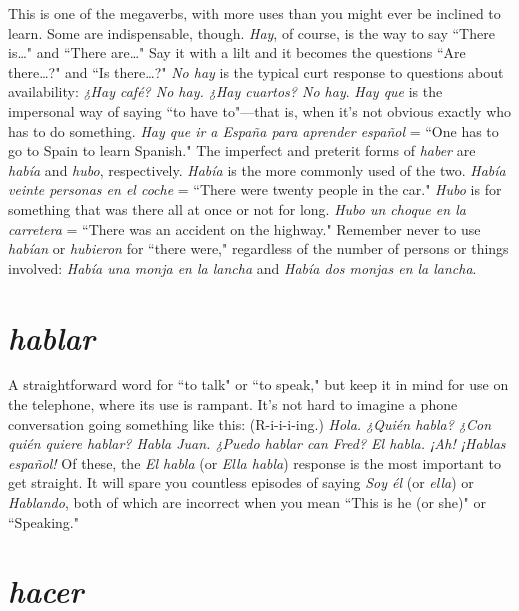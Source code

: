 This is one of the megaverbs, with more uses than you might
ever be inclined to learn. Some are indispensable, though. \emph{Hay}, of
course, is the way to say ``There is\ldots{}" and ``There are\ldots{}" Say it
with a lilt and it becomes the questions ``Are there\ldots{}?" and ``Is
there\ldots{}?" \emph{No hay} is the typical curt response to questions about
availability: \emph{¿Hay café? No hay. ¿Hay cuartos? No hay}. \emph{Hay que} is the
impersonal way of saying ``to have to"---that is, when it's not obvious
exactly who has to do something. \emph{Hay que ir a España para aprender
español} = ``One has to go to Spain to learn Spanish." The imperfect
and preterit forms of \emph{haber} are \emph{había} and \emph{hubo}, respectively. \emph{Había}
is the more commonly used of the two. \emph{Había veinte personas en el
coche} = ``There were twenty people in the car." \emph{Hubo} is for something that was there all at once or not for long. \emph{Hubo un choque en la
carretera} = ``There was an accident on the highway." Remember never
to use \emph{habían} or \emph{hubieron} for ``there were," regardless of the number
of persons or things involved: \emph{Había una monja en la lancha} and \emph{Había dos monjas en la lancha}.

\section{\emph{hablar}}

A straightforward word for ``to talk" or ``to speak," but keep
it in mind for use on the telephone, where its use is rampant. It's not
hard to imagine a phone conversation going something like this:
(R-i-i-i-ing.) \emph{Hola. ¿Quién habla? ¿Con quién quiere hablar? Habla
Juan. ¿Puedo hablar can Fred? El habla. ¡Ah! ¡Hablas español!} Of
these, the \emph{El habla} (or \emph{Ella habla}) response is the most important to
get straight. It will spare you countless episodes of saying \emph{Soy él} (or
\emph{ella}) or \emph{Hablando}, both of which are incorrect when you mean ``This
is he (or she)" or ``Speaking."

\section{\emph{hacer}}


